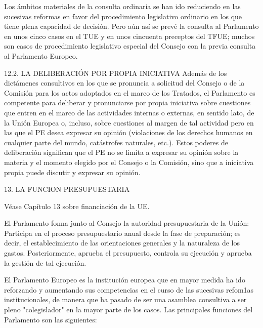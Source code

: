 \documentclass[10pt,a4paper]{article}
\begin{document}
Los ámbitos materiales de la consulta ordinaria se han ido reduciendo en las sucesivas reformas en favor del procedimiento legislativo ordinario en los que tiene plena capacidad de decisión. Pero aún así se prevé la consulta al Parlamento en unos cinco casos en el TUE y en unos cincuenta preceptos del TFUE; muchos son casos de procedimiento legislativo especial del Consejo con la previa consulta al Parlamento Europeo.


12.2. LA DELIBERACIÓN POR PROPIA INICIATIVA
Además de los dictámenes consultivos en los que se pronuncia a solicitud del Consejo o de la Comisión para los actos adoptados en el marco de los Tratados, el Parlamento es competente para deliberar y pronunciarse por propia iniciativa sobre cuestiones que entren en el marco de las actividades internas o externas, en sentido lato, de la Unión Europea o, incluso, sobre cuestiones al margen de tal actividad pero en las que el PE desea expresar su opinión (violaciones de los derechos humanos en cualquier parte del mundo, catástrofes naturales, etc.). Estos poderes de deliberación significan que el PE no se limita a expresar su opinión sobre la materia y el momento elegido por el Consejo o la Comisión, sino que a iniciativa propia puede discutir y expresar su opinión.


13. LA FUNCION PRESUPUESTARIA

Véase Capítulo 13 sobre financiación de la UE.

El Parlamento fonna junto al Consejo la autoridad presupuestaria de la Unión: Participa en el proceso presupuestario anual desde la fase de preparación; es decir, el establecimiento de las orientaciones generales y la naturaleza de los gastos. Posteriormente, aprueba el presupuesto, controla su ejecución y aprueba la gestión de tal ejecución.







El Parlamento Europeo es la institución europea que en mayor medida ha ido reforzando y aumentando sus competencias en el curso de las sucesivas refom1as institucionales, de manera que ha pasado de ser una asamblea consultiva a ser pleno "colegislador" en la mayor parte de los casos. Las principales funciones del Parlamento son las siguientes:
\end{document}
